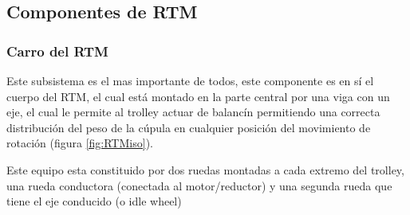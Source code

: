            \subsection{Componentes de RTM}     
                \subsubsection{Carro del RTM}
                    Este subsistema es el mas importante de todos, este componente es en sí el cuerpo del RTM, el cual está montado en la parte central por una viga con un eje, el cual le permite al trolley actuar de balancín permitiendo una correcta distribución del peso de la cúpula en cualquier posición del movimiento de rotación (figura \ref{fig:RTMiso}).
                    
                    Este equipo esta constituido por dos ruedas montadas a cada extremo del trolley, una rueda conductora (conectada al motor/reductor) y una segunda rueda que tiene el eje conducido (o idle wheel)
